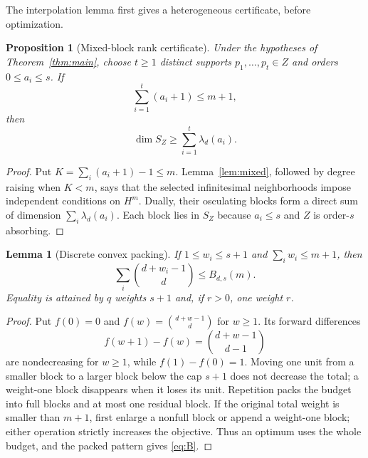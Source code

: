 \documentclass[11pt]{article}
\newtheorem{proposition}[theorem]{Proposition}
\newtheorem{lemma}[theorem]{Lemma}
\theoremstyle{definition}
\theoremstyle{remark}
\theoremstyle{plain}
\begin{document}
The interpolation lemma first gives a heterogeneous certificate, before
optimization.

\begin{proposition}[Mixed-block rank certificate]\label{prop:certificate}
Under the hypotheses of Theorem~\ref{thm:main}, choose $t\geq1$ distinct supports
$p_1,\ldots,p_t\in Z$ and orders $0\leq a_i\leq s$.  If
\[
 \sum_{i=1}^t(a_i+1)\leq m+1,
\]
then
\[
 \dim S_Z\geq\sum_{i=1}^t\lambda_d(a_i).
\]
\end{proposition}

\begin{proof}
Put $K=\sum_i(a_i+1)-1\leq m$.  Lemma~\ref{lem:mixed}, followed by degree
raising when $K<m$, says that the selected infinitesimal neighborhoods impose
independent conditions on $H^m$.  Dually, their osculating blocks form a direct
sum of dimension $\sum_i\lambda_d(a_i)$.  Each block lies in $S_Z$ because
$a_i\leq s$ and $Z$ is order-$s$ absorbing.
\end{proof}

\begin{lemma}[Discrete convex packing]\label{lem:packing}
If $1\leq w_i\leq s+1$ and $\sum_iw_i\leq m+1$, then
\[
 \sum_i\binom{d+w_i-1}{d}\leq B_{d,s}(m).
\]
Equality is attained by $q$ weights $s+1$ and, if $r>0$, one weight $r$.
\end{lemma}

\begin{proof}
Put $f(0)=0$ and $f(w)=\binom{d+w-1}{d}$ for $w\geq1$.  Its forward differences
\[
 f(w+1)-f(w)=\binom{d+w-1}{d-1}
\]
are nondecreasing for $w\geq1$, while $f(1)-f(0)=1$.  Moving one unit from a
smaller block to a larger block below the cap $s+1$ does not decrease the
total; a weight-one block disappears when it loses its unit.  Repetition packs
the budget into full blocks and at most one residual block.  If the original total
weight is smaller than $m+1$, first enlarge a nonfull block or append a
weight-one block; either operation strictly increases the objective.  Thus an
optimum uses the whole budget, and the packed pattern gives \eqref{eq:B}.
\end{proof}
\end{document}
